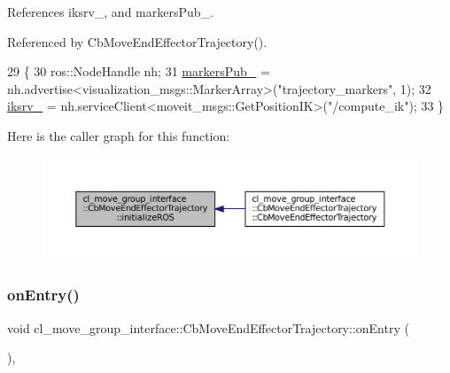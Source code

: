 References iksrv\+\_\+, and markers\+Pub\+\_\+.



Referenced by Cb\+Move\+End\+Effector\+Trajectory().


\begin{DoxyCode}
29     \{
30         ros::NodeHandle nh;
31         \hyperlink{classcl__move__group__interface_1_1CbMoveEndEffectorTrajectory_aabc2216b2d8625fecd83c5ec69928e63}{markersPub\_} = nh.advertise<visualization\_msgs::MarkerArray>(\textcolor{stringliteral}{"trajectory\_markers"}, 1);
32         \hyperlink{classcl__move__group__interface_1_1CbMoveEndEffectorTrajectory_a8a2e2225a5b53325241e45e4e28fa3a7}{iksrv\_} = nh.serviceClient<moveit\_msgs::GetPositionIK>(\textcolor{stringliteral}{"/compute\_ik"});
33     \}
\end{DoxyCode}
Here is the caller graph for this function\+:
\nopagebreak
\begin{figure}[H]
\begin{center}
\leavevmode
\includegraphics[width=350pt]{classcl__move__group__interface_1_1CbMoveEndEffectorTrajectory_afcee8f3853a5cef8806137a304c8a14b_icgraph}
\end{center}
\end{figure}
\mbox{\label{classcl__move__group__interface_1_1CbMoveEndEffectorTrajectory_aaedd074fd178c6390a4a3f1ccff23ad3}} 
\subsubsection{\texorpdfstring{on\+Entry()}{onEntry()}}
{\footnotesize\ttfamily void cl\+\_\+move\+\_\+group\+\_\+interface\+::\+Cb\+Move\+End\+Effector\+Trajectory\+::on\+Entry (\begin{DoxyParamCaption}{ }\end{DoxyParamCaption})\hspace{0.3cm}{\ttfamily [override]}, {\ttfamily [virtual]}}



